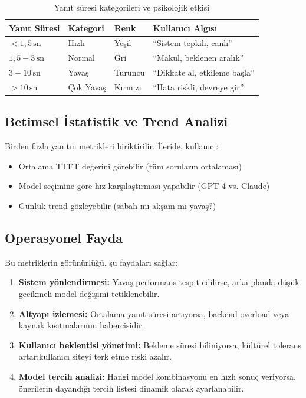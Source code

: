 \documentclass[12pt,a4paper]{article}
\begin{document}
\begin{table}[h!]
  \centering\small
  \begin{tabular}{@{} P{2.5cm} P{2.5cm} P{3cm} P{3.5cm} @{}}
    \toprule
    Yanıt Süresi & Kategori & Renk & Kullanıcı Algısı \\
    \midrule
    $< 1{,}5\,\text{sn}$ & Hızlı & Yeşil & ``Sistem tepkili, canlı'' \\
    $1{,}5 - 3\,\text{sn}$ & Normal & Gri & ``Makul, beklenen aralık'' \\
    $3 - 10\,\text{sn}$ & Yavaş & Turuncu & ``Dikkate al, etkileme başla'' \\
    $> 10\,\text{sn}$ & Çok Yavaş & Kırmızı & ``Hata riskli, devreye gir'' \\
    \bottomrule
  \end{tabular}
  \caption{Yanıt süresi kategorileri ve psikolojik etkisi}
\end{table}

\subsection{Betimsel İstatistik ve Trend Analizi}

Birden fazla yanıtın metrikleri biriktirilir. İleride, kullanıcı:
\begin{itemize}[leftmargin=*]
  \item Ortalama TTFT değerini görebilir (tüm soruların ortalaması)
  \item Model seçimine göre hız karşılaştırması yapabilir (GPT-4 vs. Claude)
  \item Günlük trend gözleyebilir (sabah mı akşam mı yavaş?)
\end{itemize}

\subsection{Operasyonel Fayda}

Bu metriklerin görünürlüğü, şu faydaları sağlar:

\begin{enumerate}[leftmargin=*]
  \item \textbf{Sistem yönlendirmesi:} Yavaş performans tespit edilirse, arka planda düşük gecikmeli model değişimi tetiklenebilir.
  \item \textbf{Altyapı izlemesi:} Ortalama yanıt süresi artıyorsa, backend overload veya kaynak kısıtmalarının habercisidir.
  \item \textbf{Kullanıcı beklentisi yönetimi:} Bekleme süresi biliniyorsa, kültürel tolerans artar;kullanıcı siteyi terk etme riski azalır.
  \item \textbf{Model tercih analizi:} Hangi model kombinasyonu en hızlı sonuç veriyorsa, önerilerin dayandığı tercih listesi dinamik olarak ayarlanabilir.
\end{enumerate}
\end{document}

